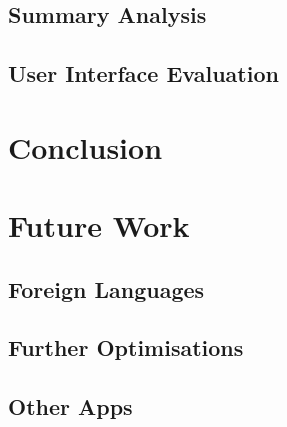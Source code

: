 \documentclass[12pt]{article}
\begin{document}

\subsection{Summary Analysis}

\subsection{User Interface Evaluation}


\newpage

\section{Conclusion}


\newpage

\section{Future Work}

\subsection{Foreign Languages}

\subsection{Further Optimisations}

\subsection{Other Apps}


\newpage

\printbibliography[heading=bibintoc]


\newpage
\end{document}
